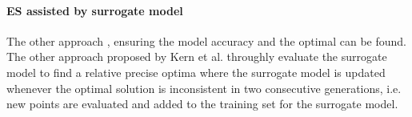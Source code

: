 \paragraph{ES assisted by surrogate model}
The other approach , ensuring the model accuracy and the optimal can be found. The other approach proposed by Kern et al. \cite{10.1007/11844297_95} throughly evaluate the surrogate model to find a relative precise optima where the surrogate model is updated whenever the optimal solution is inconsistent in two consecutive generations, i.e. new points are evaluated and added to the training set for the surrogate model.  







